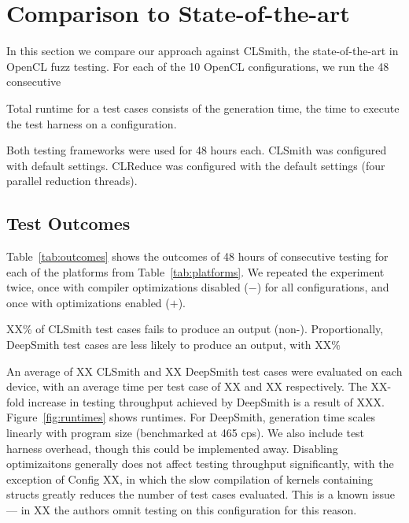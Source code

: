 \section{Comparison to State-of-the-art}\label{sec:vs_clsmith}

In this section we compare our approach against CLSmith, the state-of-the-art in OpenCL fuzz testing. For each of the 10 OpenCL configurations, we run the  48 consecutive

Total runtime for a test cases consists of the generation time, the time to execute the test harness on a configuration.

Both testing frameworks were used for 48 hours each. CLSmith was configured with default settings. CLReduce was configured with the default settings (four parallel reduction threads).

%

\subsection{Test Outcomes}

Table~\ref{tab:outcomes} shows the outcomes of 48 hours of consecutive testing for each of the platforms from Table~\ref{tab:platforms}. We repeated the experiment twice, once with compiler optimizations disabled ($-$) for all configurations, and once with optimizations enabled ($+$).

XX\% of CLSmith test cases fails to produce an output (non-\cmark). Proportionally, DeepSmith test cases are less likely to produce an output, with XX\%

An average of XX CLSmith and XX DeepSmith test cases were evaluated on each device, with an average time per test case of XX and XX respectively. The XX-fold increase in testing throughput achieved by DeepSmith is a result of XXX. Figure~\ref{fig:runtimes} shows runtimes. For DeepSmith, generation time scales linearly with program size (benchmarked at 465 cps). We also include test harness overhead, though this could be implemented away. Disabling optimizaitons generally does not affect testing throughput significantly, with the exception of Config XX, in which the slow compilation of kernels containing structs greatly reduces the number of test cases evaluated. This is a known issue --- in XX the authors omnit testing on this configuration for this reason.

